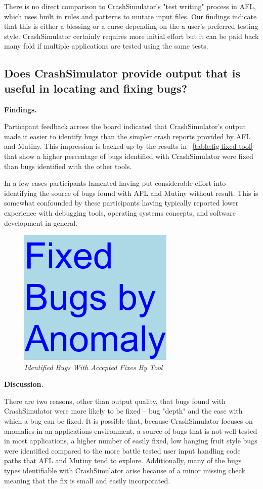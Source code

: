 There is no direct comparison to CrashSimulator's "test writing"
process in AFL, which
uses built in rules and patterns to mutate input files.  Our
findings indicate that this is either a blessing or a curse
depending on the
a user's preferred testing style.  CrashSimulator certainly requires
more initial effort but it can be paid back many fold if multiple
applications are tested using the same tests.


\subsection{Does CrashSimulator provide output that is useful in locating
and fixing bugs?}


{\bf Findings. }

Participant feedback across the board indicated that CrashSimulator's
output made it easier to identify bugs than the simpler crash reports
provided by AFL and Mutiny.  This impression is backed up by the results in
~\ref{table:fig-fixed-tool} that
show a higher percentage of bugs identified with
CrashSimulator were fixed than bugs identified with the other tools.

In a few cases participants lamented having put considerable effort into
identifying the source of bugs found with AFL and Mutiny without result.
This is somewhat confounded by these participants having typically reported
lower experience with debugging tools, operating systems concepts, and
software development in general.


\begin{figure}[t]
  \center{}
  \includegraphics[scale=.5]{images/table3}
  \caption{\emph{Identified Bugs With Accepted Fixes By Tool}}
  \label{fig-fixed-tool}
\end{figure}


{\bf Discussion. }

There are two reasons, other than output quality, that bugs found with
CrashSimulator were more likely to be fixed -- bug "depth" and the ease
with which a bug can be fixed.  It is possible that, because CrashSimulator
focuses on anomalies in an applications environment, a source of bugs that
is not well tested in most applications, a higher number of easily fixed,
low
hanging fruit style bugs were identified compared to the more battle tested
user input handling code paths that AFL and Mutiny tend to explore.
Additionally, many of the bugs types identifiable with CrashSimulator arise
because of a minor missing check meaning that the fix is small and easily
incorporated.

